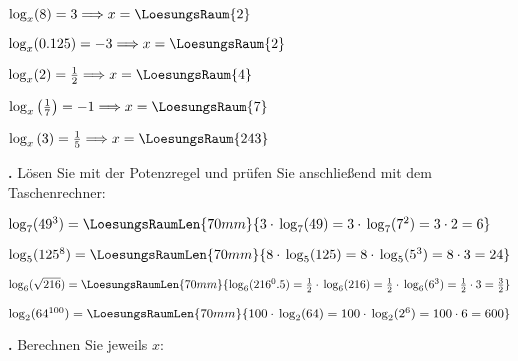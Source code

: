 \begin{bbwAufgabenBlock}
\item $\log_x(8) = 3 \Longrightarrow x =    \LoesungsRaum{2}$
\item $\log_x(0.125) = -3 \Longrightarrow x =    \LoesungsRaum{2}$
\item $\log_x(2) = \frac12 \Longrightarrow x =    \LoesungsRaum{4}$
\item $\log_x\left(\frac17\right) = -1 \Longrightarrow x =    \LoesungsRaum{7}$
\item $\log_x\left( 3 \right) = \frac15 \Longrightarrow x =    \LoesungsRaum{243}$

\end{bbwAufgabenBlock}


\newpage

\textbf{\bbwAufgabenNummer{}.}
Lösen Sie mit der Potenzregel und prüfen Sie anschließend mit dem Taschenrechner: 

\begin{bbwAufgabenBlock}
\item $\log_7(49^3) = \LoesungsRaumLen{70mm}{3\cdot{}\log_7(49) = 3 \cdot{}  \log_7(7^2) = 3\cdot{} 2 = 6}$

\item
 $\log_5(125^8) = \LoesungsRaumLen{70mm}{8 \cdot{}\log_5(125) = 8 \cdot{}  \log_5(5^3) =  8\cdot{} 3 = 24}$

\item  $\log_6(\sqrt{216}) = \LoesungsRaumLen{70mm}{\log_6(216^0.5)= \frac12
   \cdot{}\log_6(216) = \frac12 \cdot{}  \log_6(6^3) = \frac12\cdot{} 3 = \frac32}$
   
\item $\log_2(64^{100}) = \LoesungsRaumLen{70mm}{100 \cdot{}\log_2(64) = 100 \cdot{}  \log_2(2^6) =  100\cdot{} 6 = 600}$

%
\end{bbwAufgabenBlock}

\TNTeop{}

\newpage

\textbf{\bbwAufgabenNummer{}.}
Berechnen Sie jeweils $x$:


